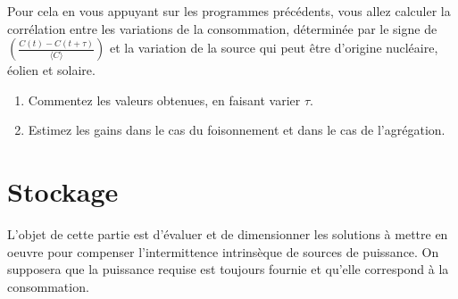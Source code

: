 \documentclass[12pt,a4]{article}
\newcommand{\tmtextit}[1]{{\itshape{#1}}}
\begin{document}
Pour cela en vous appuyant sur les programmes précédents, vous allez calculer la corrélation entre les variations de la consommation, déterminée par le signe de $\left( \frac{C (t) - C (t + \tau)}{\langle C \rangle} \right)$ et la variation de la source qui peut être d'origine nucléaire, éolien et solaire.

\begin{enumerate}
	\item Commentez les valeurs obtenues, en faisant varier $\tau$.
	
	\item Estimez les gains dans le cas du foisonnement et dans le cas de l'agrégation.
	
\end{enumerate}

%
%
%	
%	



\part{Stockage}
L'objet de cette partie est d'évaluer et de dimensionner les solutions à mettre en oeuvre pour compenser l'intermittence intrinsèque de sources de puissance. On supposera que la puissance requise est toujours fournie et qu'elle correspond à la consommation.


%	
%	
%	
%	
%	
\end{document}
